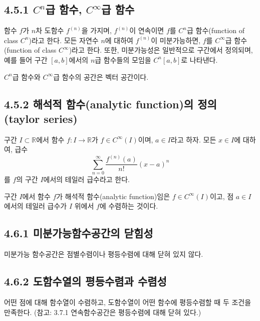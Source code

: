 \documentclass{article}
\begin{document}
\subsection*{\textmd{4.5.1 \(C^n\)급 함수, \(C^\infty\)급 함수}}
함수 \(f\)가 \(n\)차 도함수 \(f^{(n)}\)을 가지며, \(f^{(n)}\)이 연속이면 \(f\)를 \(C^n\)급 함수(function of class \(C^n\))라고 한다.
모든 자연수 \(n\)에 대하여 \(f^{(n)}\)이 미분가능하면, \(f\)를 \(C^\infty\)급 함수(function of class \(C^\infty\))라고 한다.
또한, 미분가능성은 일반적으로 구간에서 정의되며, 예를 들어 구간 \([a,b]\)에서의 \(n\)급 함수들의 모임을 \(C^n[a,b]\)로 나타낸다.

\(C^n\)급 함수와 \(C^\infty\)급 함수의 공간은 벡터 공간이다.

\subsection*{\textmd{4.5.2 해석적 함수(analytic function)의 정의 (taylor series)}}
구간 \(I \subset \mathbb{R}\)에서 함수 \(f: I \to \mathbb{R}\)가 \(f \in C^\infty(I)\)이며, \(a \in I\)라고 하자.
모든 \(x \in I\)에 대하여, 급수
\[
\sum_{n=0}^{\infty} \frac{f^{(n)}(a)}{n!} (x-a)^n
\]
를 \(f\)의 구간 \(I\)에서의 테일러 급수라고 한다.

구간 \(I\)에서 함수 \(f\)가 해석적 함수(analytic function)임은 \(f \in C^\infty(I)\)이고, 점 \(a \in I\)에서의 테일러 급수가 \(I\) 위에서 \(f\)에 수렴하는 것이다.


\subsection{\fontsize{11.5}{13}\selectfont{다음의 두 질문을 고려하자: \\ 
(1)구간에서 정의된 미분가능함수열의 극한함수 f의 \\ 미분가능성? \\
(2)극한함수 f가 미분가능하면 도함수열의 극한함수는 f’인가?}}

\subsection*{\textmd{4.6.1 미분가능함수공간의 닫힘성}}
미분가능 함수공간은 점별수렴이나 평등수렴에 대해 닫혀 있지 않다.

\subsection*{\textmd{4.6.2 도함수열의 평등수렴과 수렴성}}
어떤 점에 대해 함수열이 수렴하고, 도함수열이 어떤 함수에 평등수렴할 때 두 조건을 만족한다.
(참고: 3.7.1 연속함수공간은 평등수렴에 대해 닫혀 있다.)
\end{document}
